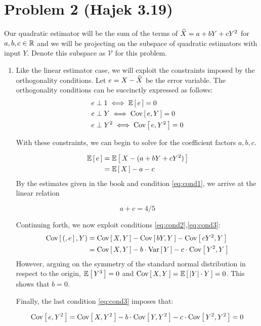 \documentclass[12pt]{article}%
\begin{document}
\section{Problem 2 (Hajek 3.19)}
   Our quadratic estimator will be the sum of the terms of $\widehat{X} = a + bY + cY^2$ for $a,b,c \in {\mathbb{R}}$ and we will be projecting on the subspace of quadratic estimators with input $Y$. Denote this subspace as $\mathcal{V}$ for this problem.
\begin{enumerate}
  \item
  Like the linear estimator case, we will exploit the constraints imposed by the orthogonality conditions. Let $e = X - \widehat{X}$ be the error variable. The orthogonality conditions can be succinctly expressed as follows:
  \begin{align}
      e & \perp 1 \iff \mathbb{E}\left[\,e\,\right] = 0 \label{eq:cond1}\\
      e & \perp Y \iff \text{Cov}\left[\,e,Y\,\right] = 0 \label{eq:cond2}\\
      e & \perp Y^2 \iff \text{Cov}\left[\,e,Y^2\,\right] = 0 \label{eq:cond3}
  \end{align}

  With these constraints, we can begin to solve for the coefficient factors $a,b,c$.

  \begin{align*}
    \mathbb{E}\left[\,e\,\right] & = \mathbb{E}\left[\,X - (a + bY + cY^2)\,\right] \\
            & = \mathbb{E}\left[\,X\,\right] - a - c
  \end{align*}
  By the estimates given in the book and condition \ref{eq:cond1}, we arrive at the linear relation

\begin{equation}
  a + c = 4/5 \label{eq:aconstantconst}
\end{equation}

  Continuing forth, we now exploit conditions \ref{eq:cond2},\ref{eq:cond3}:
  \begin{align*}
    \text{Cov}\left[\,(,e\,\right],Y) & = \text{Cov}\left[\,X,Y\,\right] - \text{Cov}\left[\,bY,Y\,\right] - \text{Cov}\left[\,cY^2,Y\,\right] \\
      & = \text{Cov}\left[\,X,Y\,\right] - b\cdot\text{Var}\left[\,Y\,\right] - c\cdot\text{Cov}\left[\,Y^2,Y\,\right]
  \end{align*}
  However, arguing on the symmetry of the standard normal distribution in respect to the origin, $\mathbb{E}\left[\,Y^3\,\right] = 0$ and $\text{Cov}\left[\,X,Y\,\right] = \mathbb{E}\left[\,\abs{Y}\cdot Y\,\right] = 0$. This shows that $b = 0$.

  Finally, the last condition \ref{eq:cond3} imposes that:

  \begin{align*}
    \text{Cov}\left[\,e,Y^2\,\right] = \text{Cov}\left[\,X,Y^2\,\right] - b\cdot \text{Cov}\left[\,Y,Y^2\,\right] - c\cdot \text{Cov}\left[\,Y^2,Y^2\,\right] = 0
  \end{align*}


\end{enumerate}
\end{document}
